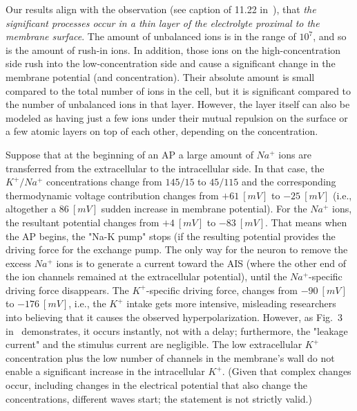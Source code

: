 Our results align with the observation (see caption of 11.22 in~\cite{MolecularBiology:2002}), that \textit{the significant processes
occur in a thin layer of the electrolyte proximal to the membrane surface}.
The amount of unbalanced ions is in the range of $10^7$,
and so is the amount of rush-in ions. In addition, those 
ions on the high-concentration side rush into the 
low-concentration side and cause a significant change in the 
membrane potential (and concentration). Their absolute amount is small compared to the total number of ions in the cell,
but it is significant compared to the number of unbalanced ions in that layer.
However, the layer itself can also be modeled
as having just a few ions under their mutual repulsion on the surface
or a few atomic layers on top of each other, depending on the concentration.



Suppose that at the beginning of an \gls{AP} a large amount of $Na^+$ ions are transferred from the extracellular to the intracellular side. In that case,  the $K^+/Na^+$ concentrations change from $145/15$ to $45/115$ and the 
corresponding thermodynamic voltage contribution changes from $+61\ [mV]$ to $-25\ [mV]$ (i.e., altogether a $86\ [mV]$ sudden increase in membrane potential). For the $Na^+$ ions, the resultant potential changes from $+4\ [mV]$ to $-83\ [mV]$. That means when the \gls{AP} begins, the "Na-K pump" stops (if the resulting potential provides the driving force for the exchange pump. The only way for the neuron to remove the excess  $Na^+$ ions is to generate a current toward the \gls{AIS} (where the other end of the ion channels remained at the extracellular potential), until the $Na^+$-specific driving force disappears. The $K^+$-specific driving force, changes from $-90\ [mV]$ to  $-176\ [mV]$, i.e., the $K^+$
intake gets more intensive, misleading researchers into believing that it causes
the observed hyperpolarization. However, as  Fig.~3 in~\cite{NeuralEnergyConsumption:2017} demonstrates, it occurs instantly, not with a delay; furthermore, the "leakage current" and the stimulus current are negligible. The low extracellular $K^+$ concentration plus the 
low number of channels in the membrane's wall
do not enable a significant increase in the intracellular $K^+$. 
(Given that complex changes occur, including changes in the electrical potential that also change the concentrations, different waves start; the statement is not strictly valid.)

